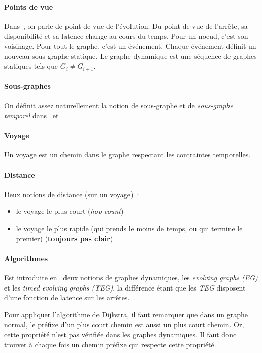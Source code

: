 \documentclass[12pt,a4paper]{article}
\begin{document}
\paragraph{Points de vue}
Dans~\cite{casteigts2012time}, on parle de point de vue de
l'évolution. Du point de vue de l'arrête, sa disponibilité et sa
latence change au cours du temps. Pour un noeud, c'est son voisinage.
Pour tout le graphe, c'est un événement. Chaque événement définit un
nouveau sous-graphe statique. Le graphe dynamique est une séquence de
graphes statiques tels que \(G_i \neq G_{i+1}\).

\paragraph{Sous-graphes}
On définit assez naturellement la notion de sous-graphe et de
\textit{sous-graphe temporel} dans~\cite{casteigts2012time}
et~\cite{latapy2017stream}.

\paragraph{Voyage}
Un voyage est un chemin dans le graphe respectant les contraintes
temporelles.

\paragraph{Distance}
Deux notions de distance (sur un voyage)~:
\begin{itemize}
\item le voyage le plus court (\textit{hop-count})
\item le voyage le plus rapide (qui prends le moins de temps, ou qui
  termine le premier) (\textbf{toujours pas clair})
\end{itemize}

\paragraph{Algorithmes}
Est introduite en~\cite{xuan2003computing} deux notions de graphes
dynamiques, les \textit{evolving graphs (EG)} et les \textit{timed
  evolving graphs (TEG)}, la différence étant que les \textit{TEG}
disposent d'une fonction de latence sur les arrêtes.

Pour appliquer l'algorithme de Dijkstra, il faut remarquer que dans un
graphe normal, le préfixe d'un plus court chemin est aussi un plus
court chemin. Or, cette propriété n'est pas vérifiée dans les graphes
dynamiques. Il faut donc trouver à chaque fois un chemin préfixe qui
respecte cette propriété.
\end{document}
